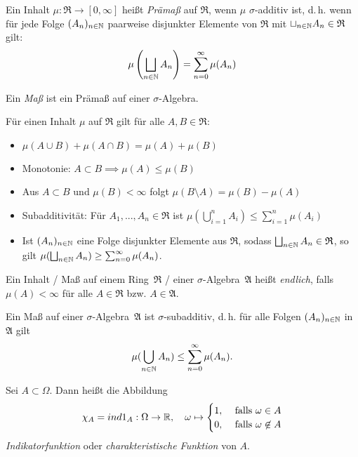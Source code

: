 \documentclass{cheat-sheet}
\newcommand{\Alg}{\mathfrak{A}}
\newcommand{\Ring}{\mathfrak{R}}
\begin{document}
\begin{defn}
  Ein Inhalt $\mu : \Ring \to [0, \infty]$ heißt \emph{Prämaß} auf $\Ring$, wenn $\mu$ $\sigma$-additiv ist, d.\,h. wenn für jede Folge $(A_n)_{n \in \mathbb{N}}$ paarweise disjunkter Elemente von $\Ring$ mit $\sqcup_{n \in \N} A_n \in \Ring$ gilt:
  \[ \mu\left(\bigsqcup_{n \in \mathbb{N}} A_n\right) = \sum_{n=0}^\infty \mu(A_n) \]
\end{defn}

\begin{defn}
  Ein \emph{Maß} ist ein Prämaß auf einer $\sigma$-Algebra.
\end{defn}

\begin{satz}
  Für einen Inhalt $\mu$ auf $\Ring$ gilt für alle $A, B \in \Ring$:
  \begin{itemize}
    \item $\mu(A \cup B) + \mu(A \cap B) = \mu(A) + \mu(B)$
    \item Monotonie: $A \subset B \implies \mu(A) \leq \mu(B)$
    \item Aus $A \subset B$ und $\mu(B) < \infty$ folgt $\mu(B \setminus A) = \mu(B) - \mu(A)$
    \item Subadditivität: Für $A_1, ..., A_n \in \Ring$ ist $\mu\left(\bigcup_{i = 1}^n A_i \right) \leq \sum_{i = 1}^n \mu(A_i)$
    \item Ist $(A_n)_{n \in \mathbb{N}}$ eine Folge disjunkter Elemente aus $\Ring$, sodass $\bigsqcup_{n \in \N} A_n \in \Ring$, so gilt $\mu(\bigsqcup_{n \in \mathbb{N}} A_n) \geq \sum_{n=0}^\infty \mu(A_n)$.
  \end{itemize}
\end{satz}

\begin{defn}
  Ein Inhalt / Maß auf einem Ring~$\Ring$ / einer $\sigma$-Algebra~$\Alg$ heißt \emph{endlich}, falls $\mu(A) < \infty$ für alle $A \in \Ring$ bzw. $A \in \Alg$.
\end{defn}

\begin{satz}
  Ein Maß auf einer $\sigma$-Algebra~$\Alg$ ist $\sigma$-subadditiv, d.\,h. für alle Folgen $(A_n)_{n \in \mathbb{N}}$ in $\Alg$ gilt
  \[ \mu(\bigcup_{n \in \mathbb{N}} A_n) \leq \sum_{n=0}^\infty \mu(A_n). \]
\end{satz}

\begin{defn}
  Sei $A \subset \Omega$. Dann heißt die Abbildung
  \[ \chi_A = ind{1}_A : \Omega \to \mathbb{R}, \quad \omega \mapsto \begin{cases} 1, & \text{ falls } \omega \in A \\ 0, & \text{ falls } \omega \not\in A \end{cases} \]
  \emph{Indikatorfunktion} oder \emph{charakteristische Funktion} von $A$.
\end{defn}
\end{document}
